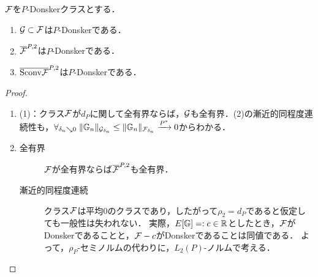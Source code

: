 \documentclass[uplatex,dvipdfmx]{jsreport}
\begin{document}
\begin{proposition}\label{prop-Donsker-preservation-1}
    $\mathcal{F}$を$P$-Donskerクラスとする．
    \begin{enumerate}
        \item $\mathcal{G}\subset\mathcal{F}$は$P$-Donskerである．
        \item $\overline{\mathcal{F}}^{P,2}$は$P$-Donskerである．
        \item $\overline{\mathrm{Sconv}\mathcal{F}}^{P,2}$は$P$-Donskerである．
    \end{enumerate}
\end{proposition}
\begin{proof}\mbox{}
    \begin{enumerate}
        \item (1)：クラス$\mathcal{F}$が$d_P$に関して全有界ならば，$\mathcal{G}$も全有界．(2)の漸近的同程度連続性も，$\forall_{\delta_n\searrow0}\;\|\mathbb{G}_n\|_{\mathcal{G}_{\delta_n}}\le\|\mathbb{G}_n\|_{\mathcal{F}_{\delta_n}}\xrightarrow{P^*}0$からわかる．
        \item \begin{description}
            \item[全有界] $\mathcal{F}$が全有界ならば$\overline{\mathcal{F}}^{P,2}$も全有界．
            \item[漸近的同程度連続] クラス$\mathcal{F}$は平均$0$のクラスであり，したがって$\rho_2=d_P$であると仮定しても一般性は失われない．
            実際，$E[\mathbb{G}]=:c\in\mathbb{R}$としたとき，$\mathcal{F}$がDonskerであることと，$\mathcal{F}-c$がDonskerであることは同値である．
            よって，$\rho_P$-セミノルムの代わりに，$L_2(P)$-ノルムで考える．
            

\end{description}
\end{enumerate}
\end{proof}
\end{document}

